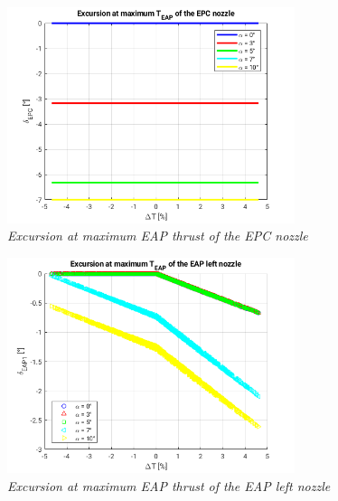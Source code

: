 \documentclass[12pt,fleqn,openany]{book} %
\begin{document}
\\ \\ \\ \\ \\ \\ \\ \\ \\ \\ \\ \\
 \begin{figure}[h]
 \centering
 \includegraphics[width=0.75\textwidth]{emaxT}
 \caption{\emph{Excursion at maximum EAP thrust of the EPC nozzle}}
 \label{fig:emaxt}
\end{figure}
\begin{figure}[h]
 \centering
 \includegraphics[width=0.75\textwidth]{emaxTl}
 \caption{\emph{Excursion at maximum EAP thrust of the EAP left nozzle}}
 \label{fig:emaxtl}
\end{figure}
\end{document}
